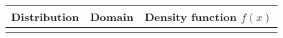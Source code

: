 \begin{tabularx}{\linewidth}{llX}
	Distribution & Domain & Density function $f(x)$ \\
	\midrule
	\rule{0pt}{5ex}%
	\rule{0pt}{5ex}%
\end{tabularx}

\endgroup
